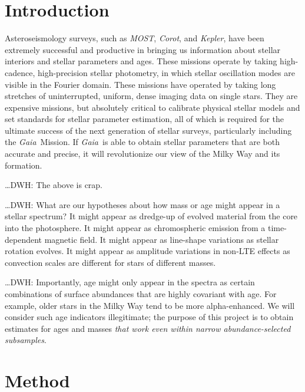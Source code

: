 \documentclass[12pt, preprint]{aastex}
\newcommand{\project}[1]{\textsl{#1}}
\newcommand{\corot}{\project{Corot}}
\newcommand{\kepler}{\project{Kepler}}
\newcommand{\gaia}{\project{Gaia}}
\newcommand{\most}{\project{MOST}}
\begin{document}

\section{Introduction}\label{sec:Intro}

Asteroseismology surveys, such as \most, \corot, and \kepler, have
been extremely successful and productive in bringing us information
about stellar interiors and stellar parameters and ages.
These missions operate by taking high-cadence, high-precision stellar
photometry, in which stellar oscillation modes are visible in the
Fourier domain.
These missions have operated by taking long stretches of
uninterrupted, uniform, dense imaging data on single stars.
They are expensive missions, but absolutely critical to calibrate
physical stellar models and set standards for stellar parameter
estimation, all of which is required for the ultimate success of the
next generation of stellar surveys, particularly including the
\gaia\ Mission.
If \gaia\ is able to obtain stellar parameters that are both accurate
and precise, it will revolutionize our view of the Milky Way and its
formation.

\ldots DWH: The above is crap.

\ldots DWH: What are our hypotheses about how mass or age might appear
in a stellar spectrum?  It might appear as dredge-up of evolved
material from the core into the photosphere.  It might appear as
chromospheric emission from a time-dependent magnetic field.  It might
appear as line-shape variations as stellar rotation evolves.  It might
appear as amplitude variations in non-LTE effects as convection scales
are different for stars of different masses.

\ldots DWH: Importantly, age might only appear in the spectra as
certain combinations of surface abundances that are highly covariant
with age.  For example, older stars in the Milky Way tend to be more
alpha-enhanced.  We will consider such age indicators illegitimate;
the purpose of this project is to obtain estimates for ages and masses
\emph{that work even within narrow abundance-selected subsamples}.

\section{Method}
\end{document}
